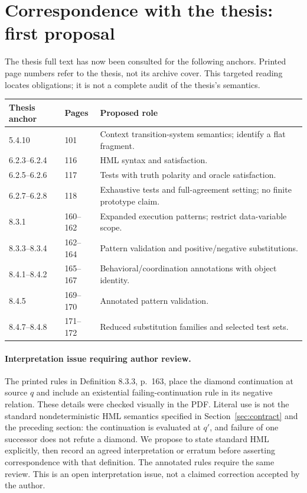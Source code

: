 \section{Correspondence with the thesis: first proposal}\label{sec:thesis}
The thesis full text has now been consulted for the following anchors. Printed
page numbers refer to the thesis, not its archive cover. This targeted reading
locates obligations; it is not a complete audit of the thesis's semantics.

\begin{center}\small
\begin{tabularx}{\linewidth}{@{}p{28mm}p{15mm}X@{}}\toprule
Thesis anchor & Pages & Proposed role\\\midrule
5.4.10 & 101 & Context transition-system semantics; identify a flat fragment.\\
6.2.3--6.2.4 & 116 & HML syntax and satisfaction.\\
6.2.5--6.2.6 & 117 & Tests with truth polarity and oracle satisfaction.\\
6.2.7--6.2.8 & 118 & Exhaustive tests and full-agreement setting; no finite prototype claim.\\
8.3.1 & 160--162 & Expanded execution patterns; restrict data-variable scope.\\
8.3.3--8.3.4 & 162--164 & Pattern validation and positive/negative substitutions.\\
8.4.1--8.4.2 & 165--167 & Behavioral/coordination annotations with object identity.\\
8.4.5 & 169--170 & Annotated pattern validation.\\
8.4.7--8.4.8 & 171--172 & Reduced substitution families and selected test sets.\\\bottomrule
\end{tabularx}
\end{center}

\paragraph{Interpretation issue requiring author review.}
The printed rules in Definition 8.3.3, p.~163, place the diamond continuation at
source $q$ and include an existential failing-continuation rule in its negative
relation. These details were checked visually in the PDF. Literal use is not the
standard nondeterministic HML semantics specified in Section~\ref{sec:contract}
and the preceding section: the continuation is evaluated at $q'$, and failure of
one successor does not refute a diamond. We propose to state standard HML
explicitly, then record an agreed interpretation or erratum before asserting
correspondence with that definition. The annotated rules require the same review.
This is an open interpretation issue, not a claimed correction accepted by the author.

